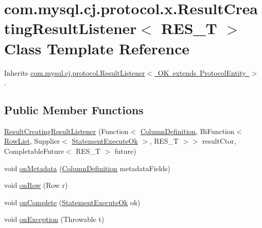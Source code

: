 \hypertarget{classcom_1_1mysql_1_1cj_1_1protocol_1_1x_1_1_result_creating_result_listener}{}\section{com.\+mysql.\+cj.\+protocol.\+x.\+Result\+Creating\+Result\+Listener$<$ R\+E\+S\+\_\+T $>$ Class Template Reference}
\label{classcom_1_1mysql_1_1cj_1_1protocol_1_1x_1_1_result_creating_result_listener}


Inherits \mbox{\hyperlink{interfacecom_1_1mysql_1_1cj_1_1protocol_1_1_result_listener}{com.\+mysql.\+cj.\+protocol.\+Result\+Listener$<$ O\+K extends Protocol\+Entity $>$}}.

\subsection*{Public Member Functions}
\begin{DoxyCompactItemize}
\item 
\mbox{\hyperlink{classcom_1_1mysql_1_1cj_1_1protocol_1_1x_1_1_result_creating_result_listener_a1ffb4216e90c5ce744b6a13b877e7aca}{Result\+Creating\+Result\+Listener}} (Function$<$ \mbox{\hyperlink{interfacecom_1_1mysql_1_1cj_1_1protocol_1_1_column_definition}{Column\+Definition}}, Bi\+Function$<$ \mbox{\hyperlink{interfacecom_1_1mysql_1_1cj_1_1result_1_1_row_list}{Row\+List}}, Supplier$<$ \mbox{\hyperlink{classcom_1_1mysql_1_1cj_1_1protocol_1_1x_1_1_statement_execute_ok}{Statement\+Execute\+Ok}} $>$, R\+E\+S\+\_\+T $>$$>$ result\+Ctor, Completable\+Future$<$ R\+E\+S\+\_\+T $>$ future)
\item 
void \mbox{\hyperlink{classcom_1_1mysql_1_1cj_1_1protocol_1_1x_1_1_result_creating_result_listener_a453e531bc60f8e74d1f19ae2ddd2fd37}{on\+Metadata}} (\mbox{\hyperlink{interfacecom_1_1mysql_1_1cj_1_1protocol_1_1_column_definition}{Column\+Definition}} metadata\+Fields)
\item 
void \mbox{\hyperlink{classcom_1_1mysql_1_1cj_1_1protocol_1_1x_1_1_result_creating_result_listener_a3b582384d167ddc242cffd7805de375c}{on\+Row}} (Row r)
\item 
void \mbox{\hyperlink{classcom_1_1mysql_1_1cj_1_1protocol_1_1x_1_1_result_creating_result_listener_a32f73b53b927ed85fbd03d4f8d18eaf0}{on\+Complete}} (\mbox{\hyperlink{classcom_1_1mysql_1_1cj_1_1protocol_1_1x_1_1_statement_execute_ok}{Statement\+Execute\+Ok}} ok)
\item 
void \mbox{\hyperlink{classcom_1_1mysql_1_1cj_1_1protocol_1_1x_1_1_result_creating_result_listener_af44c32d4ea694aea93998ebbba341605}{on\+Exception}} (Throwable t)
\end{DoxyCompactItemize}


